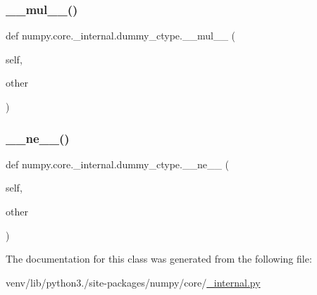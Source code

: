 \subsubsection{\texorpdfstring{\+\_\+\+\_\+mul\+\_\+\+\_\+()}{\_\_mul\_\_()}}
{\footnotesize\ttfamily def numpy.\+core.\+\_\+internal.\+dummy\+\_\+ctype.\+\_\+\+\_\+mul\+\_\+\+\_\+ (\begin{DoxyParamCaption}\item[{}]{self,  }\item[{}]{other }\end{DoxyParamCaption})}

\mbox{\label{classnumpy_1_1core_1_1__internal_1_1dummy__ctype_a74db7b62c925b1224678fa0eca90775a}} 
\subsubsection{\texorpdfstring{\+\_\+\+\_\+ne\+\_\+\+\_\+()}{\_\_ne\_\_()}}
{\footnotesize\ttfamily def numpy.\+core.\+\_\+internal.\+dummy\+\_\+ctype.\+\_\+\+\_\+ne\+\_\+\+\_\+ (\begin{DoxyParamCaption}\item[{}]{self,  }\item[{}]{other }\end{DoxyParamCaption})}



The documentation for this class was generated from the following file\+:\begin{DoxyCompactItemize}
\item 
venv/lib/python3./site-\/packages/numpy/core/\hyperlink{__internal_8py}{\+\_\+internal.\+py}\end{DoxyCompactItemize}

